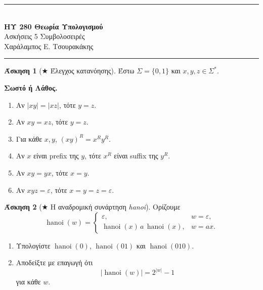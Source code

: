 \documentclass[11pt,a4paper]{article}
\newcommand{\horrule}[1]{\rule{\linewidth}{#1}}
\newcommand{\eps}{\varepsilon}
\theoremstyle{definition}
\newtheorem{question}{Άσκηση}
\begin{document}
\begin{center}
\horrule{0.4pt}\\[0.15cm]
{\large\textbf{ΗΥ 280 \textemdash{} Θεωρία Υπολογισμού}}\\[0.1cm]
{Ασκήσεις 5 \textemdash{} Συμβολοσειρές}\\[0.1cm]
{Χαράλαμπος Ε. Τσουρακάκης}\\
\horrule{0.4pt}
\end{center}

\begin{center}\end{center}\medskip

\begin{question}[$\bigstar$ Έλεγχος κατανόησης]
Έστω $\Sigma=\{0,1\}$ και $x,y,z\in\Sigma^*$.

\textbf{Σωστό ή Λάθος.}
\begin{enumerate}
\item Αν $|xy|=|xz|$, τότε $y=z$.
\item Αν $xy=xz$, τότε $y=z$.
\item Για κάθε $x,y$, $(xy)^R=x^Ry^R$.
\item Αν $x$ είναι prefix της $y$, τότε $x^R$ είναι suffix της $y^R$.
\item Αν $xy=yx$, τότε $x=y$.
\item Αν $xyz=\eps$, τότε $x=y=z=\eps$.
\end{enumerate}
\end{question}

\begin{question}[$\bigstar$ Η αναδρομική συνάρτηση \emph{hanoi}]
Ορίζουμε
\[
\operatorname{hanoi}(w)=
\begin{cases}
\eps,&w=\eps,\\
\operatorname{hanoi}(x)\,a\,\operatorname{hanoi}(x),&w=ax.
\end{cases}
\]
\begin{enumerate}
\item Υπολογίστε $\operatorname{hanoi}(0)$, $\operatorname{hanoi}(01)$ και $\operatorname{hanoi}(010)$.
\item  Αποδείξτε με επαγωγή ότι
\[
|\operatorname{hanoi}(w)|=2^{|w|}-1
\]
για κάθε $w$.
\end{enumerate}
\end{question}
\end{document}
